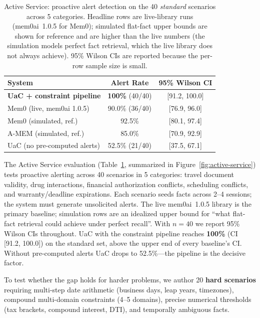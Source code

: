 \begin{table}[!ht]
\centering
\caption{Active Service: proactive alert detection on the 40 \emph{standard} scenarios across 5 categories. Headline rows are live-library runs (mem0ai~1.0.5 for Mem0); simulated flat-fact upper bounds are shown for reference and are higher than the live numbers (the simulation models perfect fact retrieval, which the live library does not always achieve). 95\% Wilson CIs are reported because the per-row sample size is small.}
\label{tab:active-service}
\begin{tabular}{@{}lcc@{}}
\toprule
\textbf{System} & \textbf{Alert Rate} & \textbf{95\% Wilson CI} \\
\midrule
\textbf{UaC + constraint pipeline} & \textbf{100\%} (40/40) & [91.2, 100.0] \\
Mem0 (live, mem0ai 1.0.5) & 90.0\% (36/40) & [76.9, 96.0] \\
\quad Mem0 (simulated, ref.) & 92.5\% & [80.1, 97.4] \\
\quad A-MEM (simulated, ref.) & 85.0\% & [70.9, 92.9] \\
UaC (no pre-computed alerts) & 52.5\% (21/40) & [37.5, 67.1] \\
\bottomrule
\end{tabular}
\end{table}

The Active Service evaluation (Table~\ref{tab:active-service}, summarized in Figure~\ref{fig:active-service}) tests proactive alerting across 40 scenarios in 5 categories: travel document validity, drug interactions, financial authorization conflicts, scheduling conflicts, and warranty/deadline expirations. Each scenario seeds facts across 2--4 sessions; the system must generate unsolicited alerts. The live mem0ai~1.0.5 library is the primary baseline; simulation rows are an idealized upper bound for ``what flat-fact retrieval could achieve under perfect recall''. With $n{=}40$ we report 95\% Wilson CIs throughout. UaC with the constraint pipeline reaches \textbf{100\%} (CI [91.2, 100.0]) on the standard set, above the upper end of every baseline's CI. Without pre-computed alerts UaC drops to 52.5\%---the pipeline is the decisive factor.

To test whether the gap holds for harder problems, we author 20 \textbf{hard scenarios} requiring multi-step date arithmetic (business days, leap years, timezones), compound multi-domain constraints (4--5 domains), precise numerical thresholds (tax brackets, compound interest, DTI), and temporally ambiguous facts.

